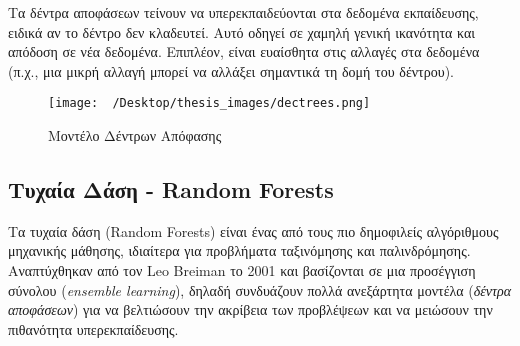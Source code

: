 \documentclass[diploma]{softlab-thesis}
\begin{document}
\begin{enumerate}
Τα δέντρα αποφάσεων τείνουν να υπερεκπαιδεύονται στα δεδομένα εκπαίδευσης, ειδικά αν το δέντρο δεν κλαδευτεί. Αυτό οδηγεί σε χαμηλή γενική ικανότητα και απόδοση σε νέα δεδομένα. Επιπλέον, είναι ευαίσθητα στις αλλαγές στα δεδομένα (π.χ., μια μικρή αλλαγή μπορεί να αλλάξει σημαντικά τη δομή του δέντρου).
\end{enumerate}

\begin{figure}[h]
    \centering
    \texttt{[image: ~/Desktop/thesis\_images/dectrees.png]} %
    \caption{Μοντέλο Δέντρων Απόφασης}
    \label{fig:your_image_label}
\end{figure}


\subsection{Τυχαία Δάση - Random Forests}

Τα τυχαία δάση (Random Forests) είναι ένας από τους πιο δημοφιλείς αλγόριθμους μηχανικής μάθησης, ιδιαίτερα για προβλήματα ταξινόμησης και παλινδρόμησης. Αναπτύχθηκαν από τον Leo Breiman το 2001 \cite{1} και βασίζονται σε μια προσέγγιση σύνολου (\textit{ensemble learning}), δηλαδή συνδυάζουν πολλά ανεξάρτητα μοντέλα (\textit{δέντρα αποφάσεων}) για να βελτιώσουν την ακρίβεια των προβλέψεων και να μειώσουν την πιθανότητα υπερεκπαίδευσης. 
\end{document}

